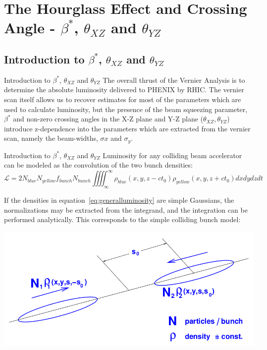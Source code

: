 \section{The Hourglass Effect and Crossing Angle - $\beta^{*}$,  $\theta_{XZ}$ and $\theta_{YZ}$ }
\label{HourglassIntro}

\subsection{Introduction to $\beta^{*}$,  $\theta_{XZ}$ and $\theta_{YZ}$ }
\label{HourglassSubIntro}

\begin{frame}{Introduction to $\beta^{*}$,  $\theta_{XZ}$ and $\theta_{YZ}$}
The overall thrust of the Vernier Analysis is to determine the absolute
luminosity delivered to PHENIX by RHIC. The vernier scan itself allows us to
recover estimates for most of the parameters which are used to calculate
luminosity, but the presence of the beam squeezing parameter, $\beta^{*}$ and
non-zero crossing angles in the X-Z plane and Y-Z plane ($\theta_{XZ},
\theta_{YZ}$) introduce z-dependence into the parameters which are extracted from
the vernier scan, namely the beam-widths, $\sigma{x}$ and $\sigma_{y}$. 
\end{frame}


\begin{frame}[shrink=20]{Introduction to $\beta^{*}$,  $\theta_{XZ}$ and $\theta_{YZ}$}
Luminosity for any colliding beam accelerator can be modeled as the convolution
of the two bunch densities:
\begin{equation}
\label{eq:generalluminosity}
\mathcal{L} = 2N_{blue}N_{yellow}f_{bunch}N_{bunch}\iiiint _{\infty}^{ \infty}{
\rho_{blue} (x,y,z-ct_0)\rho_{yellow} (x,y,z+ct_0)} dxdydzdt
\end{equation}

If the densities in equation~\ref{eq:generalluminosity} are simple Gaussians, the
normalizations may be extracted from the integrand, and the integration can be
performed analytically. This corresponds to the simple colliding bunch model:
\begin{center}
\includegraphics[width=0.75\linewidth]{../HourglassIntro/figs/simple_bunch_head_on.png}
\label{fig:xing_bunch}
\end{center}
\end{frame}

